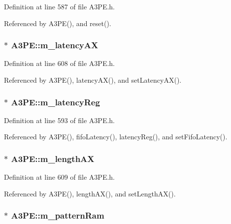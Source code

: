 Definition at line 587 of file A3PE.h.

Referenced by A3PE(), and reset().\hypertarget{classA3PE_a061472eb539bb6ac99f4fa11a760eeaf}{
\subsubsection[{m\_\-latencyAX}]{$\ast$ {\bf A3PE::m\_\-latencyAX}}}
\label{classA3PE_a061472eb539bb6ac99f4fa11a760eeaf}


Definition at line 608 of file A3PE.h.

Referenced by A3PE(), latencyAX(), and setLatencyAX().\hypertarget{classA3PE_a96a167e73e264da5a18d9ddb5ebb5f23}{
\subsubsection[{m\_\-latencyReg}]{$\ast$ {\bf A3PE::m\_\-latencyReg}}}
\label{classA3PE_a96a167e73e264da5a18d9ddb5ebb5f23}


Definition at line 593 of file A3PE.h.

Referenced by A3PE(), fifoLatency(), latencyReg(), and setFifoLatency().\hypertarget{classA3PE_a87c93a38343873f2d52741deca4750ce}{
\subsubsection[{m\_\-lengthAX}]{$\ast$ {\bf A3PE::m\_\-lengthAX}}}
\label{classA3PE_a87c93a38343873f2d52741deca4750ce}


Definition at line 609 of file A3PE.h.

Referenced by A3PE(), lengthAX(), and setLengthAX().\hypertarget{classA3PE_a84d5deabbbf2d513144dd6a00390182e}{
\subsubsection[{m\_\-patternRam}]{$\ast$ {\bf A3PE::m\_\-patternRam}}}
\label{classA3PE_a84d5deabbbf2d513144dd6a00390182e}


